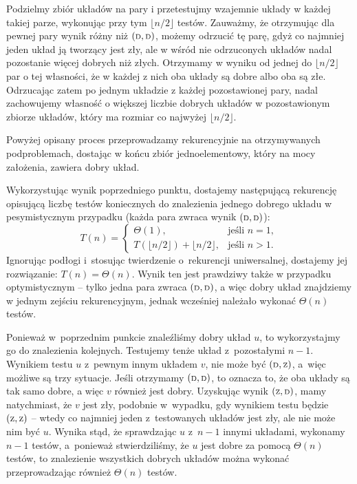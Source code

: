 \subproblem %
Podzielmy zbiór układów na pary i przetestujmy wzajemnie układy w każdej takiej parze, wykonując przy tym $\lfloor n/2\rfloor$ testów. Zauważmy, że otrzymując dla pewnej pary wynik różny niż $({\scriptstyle\rm D},{\scriptstyle\rm D})$, możemy odrzucić tę parę, gdyż co najmniej jeden układ ją tworzący jest zły, ale w wśród nie odrzuconych układów nadal pozostanie więcej dobrych niż złych. Otrzymamy w wyniku od jednej do $\lfloor n/2\rfloor$ par o tej własności, że w każdej z nich oba układy są dobre albo oba są złe. Odrzucając zatem po jednym układzie z każdej pozostawionej pary, nadal zachowujemy własność o większej liczbie dobrych układów w pozostawionym zbiorze układów, który ma rozmiar co najwyżej $\lfloor n/2\rfloor$.

Powyżej opisany proces przeprowadzamy rekurencyjnie na otrzymywanych podproblemach, dostając w końcu zbiór jednoelementowy, który na mocy założenia, zawiera dobry układ.

\subproblem %
Wykorzystując wynik poprzedniego punktu, dostajemy następującą rekurencję opisującą liczbę testów koniecznych do znalezienia jednego dobrego układu w pesymistycznym przypadku (każda para zwraca wynik $({\scriptstyle\rm D},{\scriptstyle\rm D})$):
\[
	T(n) =
	\begin{cases}
		\Theta(1), & \text{jeśli $n=1$}, \\
		T(\lfloor n/2\rfloor) + \lfloor n/2\rfloor, & \text{jeśli $n>1$}.
	\end{cases}
\]
Ignorując podłogi i~stosując twierdzenie o~rekurencji uniwersalnej, dostajemy jej rozwiązanie: $T(n)=\Theta(n)$. Wynik ten jest prawdziwy także w przypadku optymistycznym -- tylko jedna para zwraca $({\scriptstyle\rm D},{\scriptstyle\rm D})$, a więc dobry układ znajdziemy w jednym zejściu rekurencyjnym, jednak wcześniej należało wykonać $\Theta(n)$ testów.

Ponieważ w~poprzednim punkcie znaleźliśmy dobry układ $u$, to wykorzystajmy go do znalezienia kolejnych. Testujemy tenże układ z~pozostałymi $n-1$. Wynikiem testu $u$ z~pewnym innym układem $v$, nie może być $({\scriptstyle\rm D},{\scriptstyle\rm Z})$, a~więc możliwe są trzy sytuacje. Jeśli otrzymamy $({\scriptstyle\rm D},{\scriptstyle\rm D})$, to oznacza to, że oba układy są tak samo dobre, a więc $v$ również jest dobry. Uzyskując wynik $({\scriptstyle\rm Z},{\scriptstyle\rm D})$, mamy natychmiast, że $v$ jest zły, podobnie w~wypadku, gdy wynikiem testu będzie $({\scriptstyle\rm Z},{\scriptstyle\rm Z})$ -- wtedy co najmniej jeden z~testowanych układów jest zły, ale nie może nim być $u$. Wynika stąd, że sprawdzając $u$ z~$n-1$ innymi układami, wykonamy $n-1$ testów, a~ponieważ stwierdziliśmy, że $u$ jest dobre za pomocą $\Theta(n)$ testów, to znalezienie wszystkich dobrych układów można wykonać przeprowadzając również $\Theta(n)$ testów.

